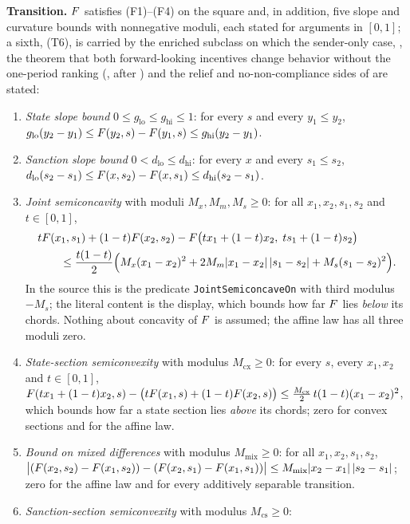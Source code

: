 \textbf{Transition.} $F$ satisfies \textup{(F1)--(F4)} on the square and,
in addition, five slope and curvature bounds with nonnegative moduli, each stated for
arguments in $[0,1]$; a sixth, \textup{(T6)}, is carried by the enriched
subclass on which the sender-only case, , the theorem
that both forward-looking incentives change behavior without the one-period
ranking (, after
) and the relief and no-non-compliance sides of
 are stated:
\begin{enumerate}[label=(T\arabic*)]
\item \emph{State slope bound} $0\le g_{\mathrm{lo}}\le g_{\mathrm{hi}}\le1$:
for every $s$ and every $y_1\le y_2$,
$g_{\mathrm{lo}}(y_2-y_1)\le F(y_2,s)-F(y_1,s)\le g_{\mathrm{hi}}(y_2-y_1)$.
\item \emph{Sanction slope bound} $0<d_{\mathrm{lo}}\le d_{\mathrm{hi}}$: for
every $x$ and every $s_1\le s_2$,
$d_{\mathrm{lo}}(s_2-s_1)\le F(x,s_2)-F(x,s_1)\le d_{\mathrm{hi}}(s_2-s_1)$.
\item \emph{Joint semiconcavity} with moduli $M_x,M_m,M_s\ge0$: for
all $x_1,x_2,s_1,s_2$ and $t\in[0,1]$,
\begin{align*}
&tF(x_1,s_1)+(1-t)F(x_2,s_2)-F\bigl(tx_1+(1-t)x_2,\;ts_1+(1-t)s_2\bigr)\\
&\qquad\le\frac{t(1-t)}2\Bigl(M_x(x_1-x_2)^2+2M_m|x_1-x_2|\,|s_1-s_2|+M_s(s_1-s_2)^2\Bigr).
\end{align*}
In the source this is the predicate \texttt{JointSemiconcaveOn} with
third modulus $-M_s$; the literal content is the display, which bounds how
far $F$ lies \emph{below} its chords. Nothing about concavity of $F$ is
assumed; the affine law has all three moduli zero.
\item \emph{State-section semiconvexity} with modulus $M_{\mathrm{cx}}\ge0$:
for every $s$, every $x_1,x_2$ and $t\in[0,1]$,
$F(tx_1+(1-t)x_2,s)-\bigl(tF(x_1,s)+(1-t)F(x_2,s)\bigr)
\le\tfrac{M_{\mathrm{cx}}}2\,t(1-t)(x_1-x_2)^2$,
which bounds how far a state section lies \emph{above} its chords; zero for
convex sections and for the affine law.
\item \emph{Bound on mixed differences} with modulus $M_{\mathrm{mix}}\ge0$: for all
$x_1,x_2,s_1,s_2$,
$\bigl|(F(x_2,s_2)-F(x_1,s_2))-(F(x_2,s_1)-F(x_1,s_1))\bigr|
\le M_{\mathrm{mix}}|x_2-x_1|\,|s_2-s_1|$;
zero for the affine law and for every additively separable transition.
\item \emph{Sanction-section semiconvexity} with modulus $M_{\mathrm{cs}}\ge0$:

\end{enumerate}
